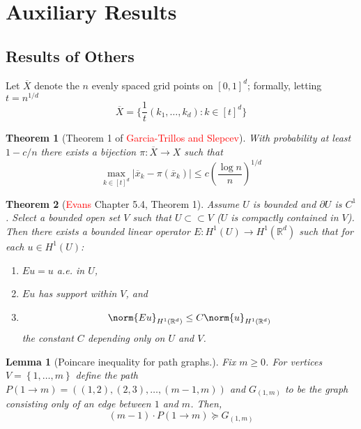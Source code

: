 \documentclass{article}
\newcommand{\Reals}{\mathbb{R}}
\newcommand{\abs}[1]{\left \lvert #1 \right \rvert}
\newcommand{\set}[1]{\left\{#1\right\}}
\newcommand{\1}{\mathbf{1}}
\newcommand{\Rd}{\Reals^d}
\theoremstyle{alden}
\theoremstyle{aldenthm}
\newtheorem{theorem}{Theorem}
\newtheorem{lemma}{Lemma}
\theoremstyle{definition}
\theoremstyle{remark}
\begin{document}
\section{Auxiliary Results}

\subsection{Results of Others}

Let $\overline{X}$ denote the $n$ evenly spaced grid points on $[0,1]^d$; formally, letting $t = n^{1/d}$
\begin{equation*}
\overline{X} = \biggl\{\frac{1}{t}(k_1,\ldots,k_d): k \in [t]^d\biggr\}
\end{equation*}

\begin{theorem}[Theorem 1 of \textcolor{red}{Garcia-Trillos and Slepcev}]
	\label{thm:slepcev_transport_distance}
	With probability at least $1 - c/n$ there exists a bijection $\pi: \overline{X} \to X$ such that
	\begin{equation}
	\label{eqn:slepcev_transport_distance}
	\max_{k \in [t]^d} \abs{\overline{x}_k - \pi(\overline{x}_k)} \leq c \left(\frac{\log n}{n}\right)^{1/d}
	\end{equation}
\end{theorem}

\begin{theorem}[\textcolor{red}{Evans} Chapter 5.4, Theorem 1]
	\label{thm:evans_extension}
	Assume $U$ is bounded and $\partial U$ is $C^1$. Select a bounded open set $V$ such that $U \subset \subset V$ ($U$ is compactly contained in $V$). Then there exists a bounded linear operator $E: H^1(U) \to H^1(\Rd)$ such that for each $u \in H^1(U)$:
	\begin{enumerate}
		\item $Eu = u$ a.e. in $U$,
		\item $Eu$ has support within $V$, and 
		\item 
		\begin{equation*}
		\norm{Eu}_{H^1(\Rd)} \leq C \norm{u}_{H^1(\Rd)}
		\end{equation*}
		the constant $C$ depending only on $U$ and $V$.
	\end{enumerate}
\end{theorem}

\begin{lemma}[Poincare inequality for path graphs.]
	\label{lem: path_poincare}
	Fix $m \geq 0$. For vertices $V = \set{1, \ldots,m}$ define the path $P(1 \to m) = ((1,2),(2,3),\ldots, (m-1,m))$ and $G_{(1,m)}$ to be the graph consisting only of an edge between $1$ and $m$. Then,
	\begin{equation*}
	(m - 1) \cdot P(1 \to m) \succeq G_{(1,m)}
	\end{equation*}
\end{lemma}
\end{document}
